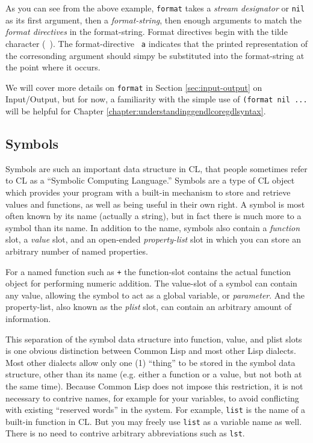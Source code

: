\documentclass [11pt]{book}
\begin{document}
As you can see from the above example, \texttt{format} takes a \emph{stream designator} or \texttt{nil} as its first argument, then a \emph{format-string}, then enough arguments to match the \emph{format directives} in the format-string. Format directives begin with the
tilde character (~).  The format-directive \texttt{~a} indicates that the printed representation of the corresonding argument should simpy be 
substituted into the format-string at the point where it occurs.



We will cover more details on \texttt{format} in Section 
\ref{sec:input-output} on Input/Output, but for now, a familiarity with the simple use of \texttt{(format nil ...} will be helpful for Chapter 
\ref{chapter:understandinggendlcoregdlsyntax}.



\subsection{Symbols}

\label{subsec:symbols}



Symbols are such an important data structure in CL, that people
sometimes refer to CL as a ``Symbolic Computing Language.'' Symbols
are a type of CL object which provides your program with a built-in
mechanism to store and retrieve values and functions, as well as being
useful in their own right. A symbol is most often known by its name
 (actually a string), but in fact there is much more to a symbol than
its name. In addition to the name, symbols also contain a \emph{function} slot, a \emph{value} slot, and an open-ended \emph{property-list} slot in which you can store an arbitrary number of named properties.



For a named function such as \texttt{+} the function-slot contains the actual function
object for performing numeric addition. The value-slot of a symbol can
contain any value, allowing the symbol to act as a global variable, or \emph{parameter}. And the property-list, also known as the \emph{plist} slot, can contain an arbitrary amount of information.



This separation of the symbol data structure into function, value, and
plist slots is one obvious distinction between Common Lisp and most
other Lisp dialects. Most other dialects allow only one (1) ``thing''
to be stored in the symbol data structure, other than its name
 (e.g. either a function or a value, but not both at the same
time). Because Common Lisp does not impose this restriction, it is not
necessary to contrive names, for example for your variables, to avoid
conflicting with existing ``reserved words'' in the system. For
example, \texttt{list} is the name of a built-in function in CL. But you
may freely use \texttt{list} as a variable name as well. There is no need to
contrive arbitrary abbreviations such as \texttt{lst}.
\end{document}
